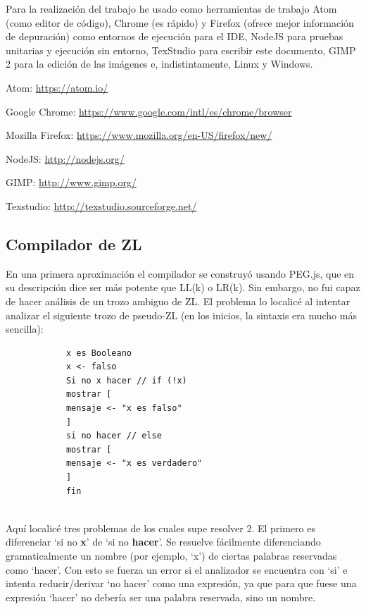 \documentclass{report}
\begin{document}
	
	Para la realización del trabajo he usado como herramientas de trabajo Atom (como editor de código), Chrome (es rápido) y Firefox (ofrece mejor información de depuración) como entornos de ejecución para el IDE, NodeJS para pruebas unitarias y ejecución sin entorno, TexStudio para escribir este documento, GIMP 2 para la edición de las imágenes e, indistintamente, Linux y Windows.  
	
	\vspace{10px}
	Atom: \href{https://atom.io/}{https://atom.io/}
	
	Google Chrome: \href{https://www.google.com/intl/es/chrome/browser/?hl=es\&brand=CHMI}{https://www.google.com/intl/es/chrome/browser}
	
	Mozilla Firefox: \href{https://www.mozilla.org/en-US/firefox/new/}{https://www.mozilla.org/en-US/firefox/new/}
	
	NodeJS: \href{http://nodejs.org/}{http://nodejs.org/}
	
	GIMP: \href{http://www.gimp.org/}{http://www.gimp.org/}
	 
	Texstudio: \href{http://texstudio.sourceforge.net/}{http://texstudio.sourceforge.net/}
	
			\subsection{Compilador de ZL}
			 
			En una primera aproximación el compilador se construyó usando PEG.js\cite{pegjs}, que en su descripción dice ser más potente que LL(k) o LR(k). Sin embargo, no fui capaz de hacer análisis de un trozo ambiguo de ZL. El problema lo localicé al intentar analizar el siguiente trozo de pseudo-ZL (en los inicios, la sintaxis era mucho más sencilla):
			
			\begin{BVerbatim}
			x es Booleano
			x <- falso
			Si no x hacer // if (!x)
			mostrar [
			mensaje <- "x es falso"
			]
			si no hacer // else
			mostrar [
			mensaje <- "x es verdadero"
			]
			fin
			\end{BVerbatim}
			\\
			
			Aquí localicé tres problemas de los cuales supe resolver 2. El primero es diferenciar `si no \textbf{x}' de `si no \textbf{hacer}'. Se resuelve fácilmente diferenciando gramaticalmente un nombre (por ejemplo, `x') de ciertas palabras reservadas como `hacer'. Con esto se fuerza un error si el analizador se encuentra con `si' e intenta reducir/derivar `no hacer' como una expresión, ya que para que fuese una expresión `hacer' no debería ser una palabra reservada, sino un nombre.
			
\end{document}
